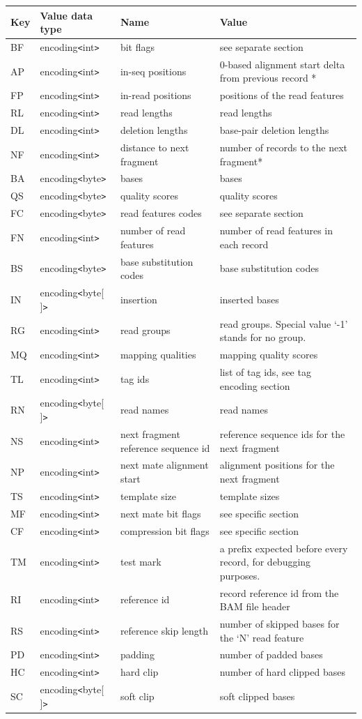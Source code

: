 \documentclass[a4paper]{article}
\begin{document}
\begin{tabular}{|l|l|>{\raggedright}p{100pt}|>{\raggedright}p{220pt}|}
\hline
\textbf{Key} & \textbf{Value data type} & \textbf{Name} & \textbf{Value}\tabularnewline
\hline
BF & encoding\texttt{<}int\texttt{>} & bit flags & see separate section\tabularnewline
\hline
AP & encoding\texttt{<}int\texttt{>} & in-seq positions & 0-based alignment start 
delta from previous record *\tabularnewline
\hline
FP & encoding\texttt{<}int\texttt{>} & in-read positions & positions of the read 
features\tabularnewline
\hline
RL & encoding\texttt{<}int\texttt{>} & read lengths & read lengths\tabularnewline
\hline
DL & encoding\texttt{<}int\texttt{>} & deletion lengths & base-pair deletion lengths\tabularnewline
\hline
NF & encoding\texttt{<}int\texttt{>} & distance to next fragment & number of records 
to the next fragment*\tabularnewline
\hline
BA & encoding\texttt{<}byte\texttt{>} & bases & bases\tabularnewline
\hline
QS & encoding\texttt{<}byte\texttt{>} & quality scores & quality scores\tabularnewline
\hline
FC & encoding\texttt{<}byte\texttt{>} & read features codes & see separate section\tabularnewline
\hline
FN & encoding\texttt{<}int\texttt{>} & number of read features & number of read 
features in each record\tabularnewline
\hline
BS & encoding\texttt{<}byte\texttt{>} & base substitution codes & base substitution 
codes\tabularnewline
\hline
IN & encoding\texttt{<}byte[ ]\texttt{>} & insertion & inserted bases\tabularnewline
\hline
RG & encoding\texttt{<}int\texttt{>} & read groups & read groups. Special value 
`-1' stands for no group.\tabularnewline
\hline
MQ & encoding\texttt{<}int\texttt{>} & mapping qualities & mapping quality scores 
 \tabularnewline
\hline
TL & encoding\texttt{<}int\texttt{>} & tag ids  & list of tag ids, see tag encoding 
section\tabularnewline
\hline
RN & encoding\texttt{<}byte[ ]\texttt{>} & read names & read names\tabularnewline
\hline
NS & encoding\texttt{<}int\texttt{>} & next fragment reference sequence id & reference 
sequence ids for the next fragment \tabularnewline
\hline
NP & encoding\texttt{<}int\texttt{>} & next mate alignment start & alignment positions 
for the next fragment\tabularnewline
\hline
TS & encoding\texttt{<}int\texttt{>} & template size & template sizes\tabularnewline
\hline
MF & encoding\texttt{<}int\texttt{>} & next mate bit flags & see specific section\tabularnewline
\hline
CF & encoding\texttt{<}int\texttt{>} & compression bit flags & see specific section\tabularnewline
\hline
TM & encoding\texttt{<}int\texttt{>} & test mark & a prefix expected before every 
record, for debugging purposes.\tabularnewline
\hline
RI & encoding\texttt{<}int\texttt{>} & reference id & record reference id from 
the BAM file header\tabularnewline
\hline
RS & encoding\texttt{<}int\texttt{>} & reference skip length & number of skipped 
bases for the `N' read feature\tabularnewline
\hline
PD & encoding\texttt{<}int\texttt{>} & padding & number of padded bases\tabularnewline
\hline
HC & encoding\texttt{<}int\texttt{>} & hard clip & number of hard clipped bases\tabularnewline
\hline
SC & encoding\texttt{<}byte[ ]\texttt{>} & soft clip & soft clipped bases\tabularnewline
\hline
\end{tabular}
\end{document}
